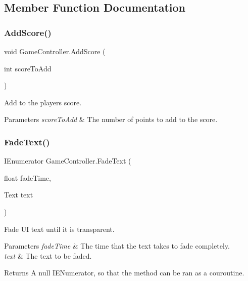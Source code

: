 \subsection{Member Function Documentation}
\mbox{\label{class_game_controller_a313aab47cf055f36c3d0ae5de701a00e}} 
\subsubsection{\texorpdfstring{Add\+Score()}{AddScore()}}
{\footnotesize\ttfamily void Game\+Controller.\+Add\+Score (\begin{DoxyParamCaption}\item[{int}]{score\+To\+Add }\end{DoxyParamCaption})}



Add to the player\textquotesingle{}s score. 


\begin{DoxyParams}{Parameters}
{\em score\+To\+Add} & The number of points to add to the score.\\
\hline
\end{DoxyParams}
\mbox{\label{class_game_controller_ae866cbc811f8f18f599b2f238d8e086f}} 
\subsubsection{\texorpdfstring{Fade\+Text()}{FadeText()}}
{\footnotesize\ttfamily I\+Enumerator Game\+Controller.\+Fade\+Text (\begin{DoxyParamCaption}\item[{float}]{fade\+Time,  }\item[{Text}]{text }\end{DoxyParamCaption})}



Fade UI text until it is transparent. 


\begin{DoxyParams}{Parameters}
{\em fade\+Time} & The time that the text takes to fade completely.\\
\hline
{\em text} & The text to be faded.\\
\hline
\end{DoxyParams}
\begin{DoxyReturn}{Returns}
A null I\+E\+Numerator, so that the method can be ran as a couroutine.
\end{DoxyReturn}
\mbox{\label{class_game_controller_a867b359e465ba013eec7f1ee03b75118}} 
